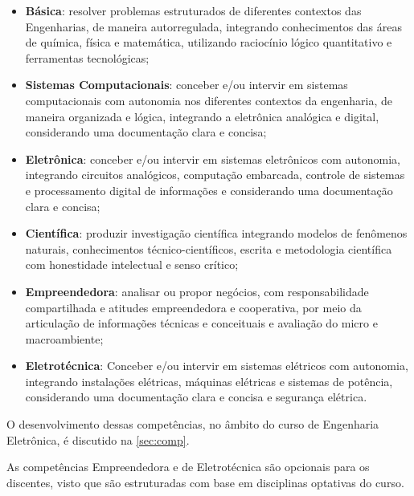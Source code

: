 \begin{itemize}
	\item \textbf{Básica}: resolver problemas estruturados de diferentes contextos das Engenharias, de maneira autorregulada, integrando conhecimentos das áreas de química, física e matemática, utilizando raciocínio lógico quantitativo e ferramentas tecnológicas;
	\item \textbf{Sistemas Computacionais}: conceber e/ou intervir em sistemas computacionais com autonomia nos diferentes contextos da engenharia, de maneira organizada e lógica, integrando a eletrônica analógica e digital, considerando uma documentação clara e concisa;
	\item \textbf{Eletrônica}: conceber e/ou intervir em sistemas eletrônicos com autonomia, integrando circuitos analógicos, computação embarcada, controle de sistemas e 	processamento digital de informações e considerando uma documentação clara e concisa;
	\item \textbf{Científica}: produzir investigação científica integrando modelos de fenômenos naturais, conhecimentos técnico-científicos, escrita e metodologia científica com honestidade intelectual e senso crítico;
	\item \textbf{Empreendedora}: analisar ou propor negócios, com responsabilidade compartilhada e atitudes empreendedora e cooperativa, por meio da articulação de informações técnicas e conceituais e avaliação do micro e macroambiente;
	\item \textbf{Eletrotécnica}: Conceber e/ou intervir em sistemas elétricos com autonomia, integrando instalações elétricas, máquinas elétricas e sistemas de potência, considerando uma documentação clara e concisa e segurança elétrica.
\end{itemize}

O desenvolvimento dessas competências, no âmbito do curso de Engenharia Eletrônica, é discutido na \autoref{sec:comp}.

As competências Empreendedora e de Eletrotécnica são opcionais para os discentes, visto que são estruturadas com base em disciplinas optativas do curso.



